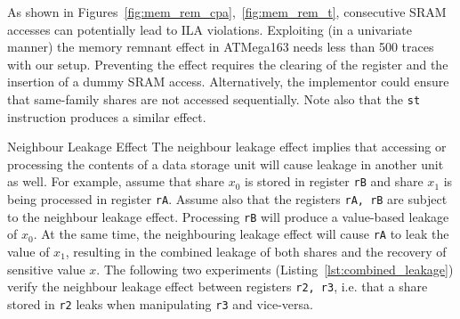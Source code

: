 As shown in Figures~\ref{fig:mem_rem_cpa},~\ref{fig:mem_rem_t}, consecutive SRAM accesses can potentially lead to ILA violations. Exploiting (in a univariate manner) the memory remnant effect in ATMega163 needs less than 500 traces with our setup. Preventing the effect requires the clearing of the register and the insertion of a dummy SRAM access. Alternatively, the implementor could ensure that same-family shares are not accessed sequentially. Note also that the \texttt{st} instruction produces a similar effect.
\begin{subsection}{Neighbour Leakage Effect}\label{combined_leakage}
The neighbour leakage effect implies that accessing or processing the contents of a data storage unit will cause leakage in another unit as well. For example, assume that share $x_0$ is stored in register \texttt{rB} and share $x_1$ is being processed in register \texttt{rA}. Assume also that the registers \texttt{rA, rB} are subject to the neighbour leakage effect. Processing \texttt{rB} will produce a value-based leakage of $x_0$. At the same time, the neighbouring leakage effect will cause \texttt{rA} to leak the value of $x_1$, resulting in the combined leakage of both shares and the recovery of sensitive value $x$. The following two experiments (Listing~\ref{lst:combined_leakage}) verify the neighbour leakage effect between registers \texttt{r2, r3}, i.e. that a share stored in \texttt{r2} leaks when manipulating \texttt{r3} and vice-versa. 




\end{subsection}
